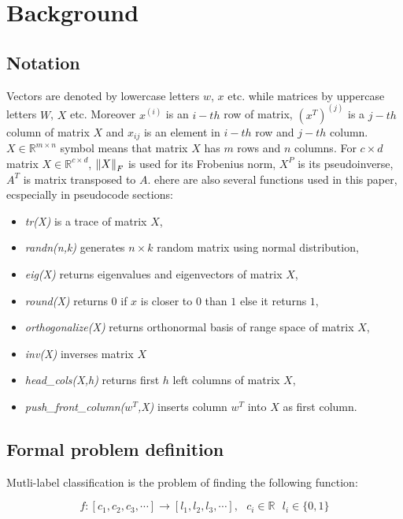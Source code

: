 
\chapter{Background}
\section{Notation}

Vectors are denoted by lowercase letters $w$, $x$ etc. while matrices by uppercase letters $W$, $X$ etc. Moreover $x^{(i)}$ is an $i-th$ row of matrix, $(x^T)^{(j)}$ is a $j-th$ column of matrix $X$ and $x_{ij}$ is an element in $i-th$ row and $j-th$ column. $X \in \mathbb{R}^{m \times n}$ symbol means that matrix $X$ has $m$ rows and $n$ columns. For $c \times d$  matrix $X \in \mathbb{R}^{c \times d}$, $\left\lVert X\right\rVert_{F}$ is used for its Frobenius norm, $X^P$ is its pseudoinverse, $A^T$ is matrix transposed to $A$. 
ehere are also several functions used in this paper, ecspecially in pseudocode sections:
\begin{itemize}
\item \textit{tr(X)} is a trace of matrix $X$, 
\item \textit{randn(n,k)} generates $n \times k$ random matrix using normal distribution,
\item \textit{eig(X)} returns eigenvalues and eigenvectors of matrix $X$,
\item \textit{round(X)} returns $0$ if $x$ is closer to $0$ than $1$ else it returns $1$,
\item \textit{orthogonalize(X)} returns orthonormal basis of range space of matrix $X$,
\item \textit{inv(X)} inverses matrix $X$
\item \textit{head\_cols(X,h)} returns first $h$ left columns of matrix $X$,
\item \textit{push\_front\_column($w^T$,X)} inserts column $w^T$ into $X$ as first column.

\end{itemize}

\section{Formal problem definition}
Mutli-label classification is the problem of finding the following function: 

\begin{equation}\label{eq:def}
    f: [c_1, c_2, c_3, \cdots] \rightarrow [l_1, l_2, l_3, \cdots], \text{ } c_i \in \mathbb{R} \text{ } l_i \in \{0,1\} 
\end{equation}

